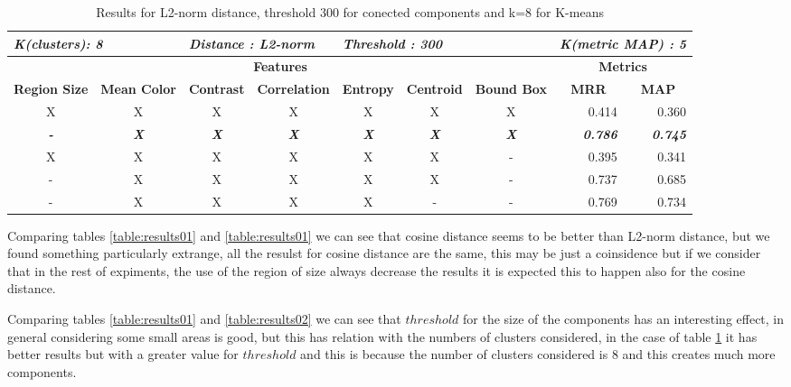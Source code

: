 \begin{table}[H]
\centering
\begin{tabular}{|c|c|c|c|c|c|c|r|r|}
\hline
\multicolumn{2}{|l|}{\textit{\textbf{K(clusters): 8}}} & \multicolumn{2}{l|}{\textit{\textbf{Distance : L2-norm}}} & \multicolumn{3}{l|}{\textit{\textbf{Threshold : 300}}} & \multicolumn{2}{l|}{\textit{\textbf{K(metric MAP) :  5}}} \\ \hline
\multicolumn{7}{|c|}{\textbf{Features}} & \multicolumn{2}{c|}{\textbf{Metrics}} \\ \hline
\textbf{Region Size} & \textbf{Mean Color} & \textbf{Contrast} & \textbf{Correlation} & \textbf{Entropy} & \textbf{Centroid} & \textbf{Bound Box} & \multicolumn{1}{c|}{\textbf{MRR}} & \multicolumn{1}{c|}{\textbf{MAP}} \\ \hline
X & X & X & X & X & X & X & 0.414 & 0.360 \\ \hline
\textit{\textbf{-}} & \textit{\textbf{X}} & \textit{\textbf{X}} & \textit{\textbf{X}} & \textit{\textbf{X}} & \textit{\textbf{X}} & \textit{\textbf{X}} & \textit{\textbf{0.786}} & \textit{\textbf{0.745}} \\ \hline
X & X & X & X & X & X & - & 0.395 & 0.341 \\ \hline
- & X & X & X & X & X & - & 0.737 & 0.685 \\ \hline
- & X & X & X & X & - & - & 0.769 & 0.734 \\ \hline
\end{tabular}
\caption{Results for L2-norm distance, threshold 300 for conected components and k=8 for K-means}
\label{table:results03}
\end{table}

Comparing tables \ref{table:results01} and \ref{table:results01} we can see that cosine distance seems to be better than L2-norm distance, but we found something particularly extrange, all the resulst for cosine distance are the same, this may be just a coinsidence but if we consider that in the rest of expiments, the use of the region of size always decrease the results it is expected this to happen also for the cosine distance.

Comparing tables \ref{table:results01} and \ref{table:results02} we can see that $threshold$ for the size of the components has an interesting effect, in general considering some small areas is good, but this has relation with the numbers of clusters considered, in the case of table \ref{table:results03} it has better results but with a greater value for $threshold$ and this is because the number of clusters considered is 8 and this creates much more components.

